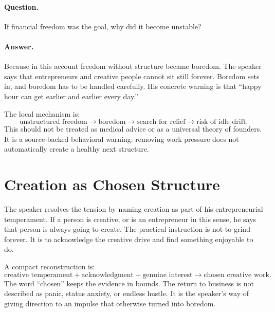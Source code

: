 \documentclass[11pt,oneside]{book}
\begin{document}
\paragraph{Question.}
If financial freedom was the goal, why did it become unstable?

\paragraph{Answer.}
Because in this account freedom without structure became boredom. The speaker says that entrepreneurs and creative people cannot sit still forever. Boredom sets in, and boredom has to be handled carefully. His concrete warning is that ``happy hour can get earlier and earlier every day.''

The local mechanism is:
\[
\text{unstructured freedom}
\longrightarrow
\text{boredom}
\longrightarrow
\text{search for relief}
\longrightarrow
\text{risk of idle drift}.
\]
This should not be treated as medical advice or as a universal theory of founders. It is a source-backed behavioral warning: removing work pressure does not automatically create a healthy next structure.

\section{Creation as Chosen Structure}

The speaker resolves the tension by naming creation as part of his entrepreneurial temperament. If a person is creative, or is an entrepreneur in this sense, he says that person is always going to create. The practical instruction is not to grind forever. It is to acknowledge the creative drive and find something enjoyable to do.

A compact reconstruction is:
\[
\text{creative temperament}
+
\text{acknowledgment}
+
\text{genuine interest}
\longrightarrow
\text{chosen creative work}.
\]
The word ``chosen'' keeps the evidence in bounds. The return to business is not described as panic, status anxiety, or endless hustle. It is the speaker's way of giving direction to an impulse that otherwise turned into boredom.
\end{document}
